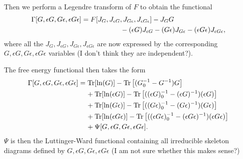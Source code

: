 \documentclass[12pt,a4paper]{scrartcl}
\numberwithin{equation}{section}
\begin{document}
Then we perform a Legendre transform of $F$ to obtain the functional
\begin{align}
 \Gamma[G, \epsilon G, G \epsilon , \epsilon G \epsilon]
 &=F[J_{G},J_{\epsilon G}, J_{G \epsilon},J_{\epsilon G \epsilon}] 
 - J_{G} G \nonumber \\
 &\hspace*{2cm} -   (\epsilon G) J_{\epsilon G} -    (G\epsilon)J_{G \epsilon}
 -    (\epsilon G \epsilon ) J_{\epsilon G \epsilon},
\end{align}
where all the $J_{G},J_{\epsilon G}, J_{G \epsilon},J_{\epsilon G \epsilon}$ are now expressed by
the corresponding $G, \epsilon G, G \epsilon , \epsilon G \epsilon$ variables (I don't think they are independent?).

The free energy functional then takes the form
\begin{align}
 \Gamma[G, \epsilon G, G \epsilon , \epsilon G \epsilon]
 &= \mathrm{Tr}[\mathrm{ln}(G)] - \mathrm{Tr}\left[ (G^{-1}_0 - G^{-1}) G \right] \\
  & \hspace{0.4cm} +\mathrm{Tr}[\mathrm{ln}(\epsilon G)] - \mathrm{Tr}\left[ ( (\epsilon G)^{-1}_0 - (\epsilon  G )^{-1}) (\epsilon G) \right] \\
  & \hspace{0.4cm} +\mathrm{Tr}[\mathrm{ln}(G\epsilon)] - \mathrm{Tr}\left[ ( (G\epsilon)^{-1}_0 - (G\epsilon )^{-1}) (G\epsilon) \right] \\
  & \hspace{0.4cm} +\mathrm{Tr}[\mathrm{ln}(\epsilon G\epsilon)] - \mathrm{Tr}\left[ ( (\epsilon G\epsilon)^{-1}_0 - (\epsilon G\epsilon )^{-1}) (\epsilon G\epsilon) \right] \\
  & \hspace{0.4cm} + \Psi[G, \epsilon G, G \epsilon , \epsilon G \epsilon].
\end{align}
$\Psi$ is then the Luttinger-Ward functional containing all irreducible skeleton diagrams defined by
$G, \epsilon G, G \epsilon , \epsilon G \epsilon$ (I am not sure whether this makes sense?)
\end{document}
